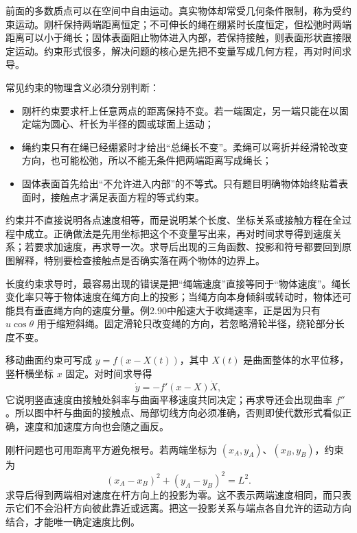 
前面的多数质点可以在空间中自由运动。真实物体却常受几何条件限制，称为受约束运动。刚杆保持两端距离恒定；不可伸长的绳在绷紧时长度恒定，但松弛时两端距离可以小于绳长；固体表面阻止物体进入内部，若保持接触，则表面形状直接限定运动。约束形式很多，解决问题的核心是先把不变量写成几何方程，再对时间求导。

常见约束的物理含义必须分别判断：
\begin{itemize}
\item 刚杆约束要求杆上任意两点的距离保持不变。若一端固定，另一端只能在以固定端为圆心、杆长为半径的圆或球面上运动；
\item 绳约束只有在绳已经绷紧时才给出“总绳长不变”。柔绳可以弯折并经滑轮改变方向，也可能松弛，所以不能无条件把两端距离写成绳长；
\item 固体表面首先给出“不允许进入内部”的不等式。只有题目明确物体始终贴着表面时，接触点才满足表面方程的等式约束。
\end{itemize}

约束并不直接说明各点速度相等，而是说明某个长度、坐标关系或接触方程在全过程中成立。正确做法是先用坐标把这个不变量写出来，再对时间求导得到速度关系；若要求加速度，再求导一次。求导后出现的三角函数、投影和符号都要回到原图解释，特别要检查接触点是否确实落在两个物体的边界上。

长度约束求导时，最容易出现的错误是把“绳端速度”直接等同于“物体速度”。绳长变化率只等于物体速度在绳方向上的投影；当绳方向本身倾斜或转动时，物体还可能具有垂直绳方向的速度分量。例2.90中船速大于收绳速率，正是因为只有 $u\cos\theta$ 用于缩短斜绳。固定滑轮只改变绳的方向，若忽略滑轮半径，绕轮部分长度不变。

移动曲面约束可写成 $y=f(x-X(t))$，其中 $X(t)$ 是曲面整体的水平位移，竖杆横坐标 $x$ 固定。对时间求导得
\begin{equation}
 \dot y=-f'(x-X)\dot X,
\end{equation}
它说明竖直速度由接触处斜率与曲面平移速度共同决定；再求导还会出现曲率 $f''$。所以图中杆与曲面的接触点、局部切线方向必须准确，否则即使代数形式看似正确，速度和加速度方向也会随之画反。

刚杆问题也可用距离平方避免根号。若两端坐标为 $(x_A,y_A)$、$(x_B,y_B)$，约束为
\begin{equation}
 (x_A-x_B)^2+(y_A-y_B)^2=L^2.
\end{equation}
求导后得到两端相对速度在杆方向上的投影为零。这不表示两端速度相同，而只表示它们不会沿杆方向彼此靠近或远离。把这一投影关系与端点各自允许的运动方向结合，才能唯一确定速度比例。

